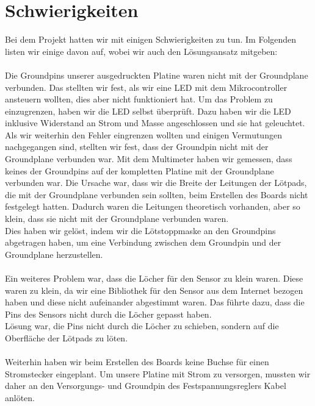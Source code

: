 \documentclass[]{article}
\begin{document}
\section{Schwierigkeiten}
Bei dem Projekt hatten wir mit einigen Schwierigkeiten zu tun. Im Folgenden listen wir einige davon auf, wobei wir auch den Lösungsansatz mitgeben:
\\\\Die Groundpins unserer ausgedruckten Platine waren nicht mit der Groundplane verbunden. Das stellten wir fest, als wir eine LED mit dem Mikrocontroller ansteuern wollten, dies aber nicht funktioniert hat. Um das Problem zu einzugrenzen, haben wir die LED selbst überprüft. Dazu haben wir die LED inklusive Widerstand an Strom und Masse angeschlossen und sie hat geleuchtet. Als wir weiterhin den Fehler eingrenzen wollten und einigen Vermutungen nachgegangen sind, stellten wir fest, dass der Groundpin nicht mit der Groundplane verbunden war. Mit dem Multimeter haben wir gemessen, dass keines der Groundpins auf der kompletten Platine mit der Groundplane verbunden war. Die Ursache war, dass wir die Breite der Leitungen der Lötpads, die mit der Groundplane verbunden sein sollten, beim Erstellen des Boards nicht festgelegt hatten. Dadurch waren die Leitungen theoretisch vorhanden, aber so klein, dass sie nicht mit der Groundplane verbunden waren.
\\Dies haben wir gelöst, indem wir die Lötstoppmaske an den Groundpins abgetragen haben, um eine Verbindung zwischen dem Groundpin und der Groundplane herzustellen.
\\\\Ein weiteres Problem war, dass die Löcher für den Sensor zu klein waren. Diese waren zu klein, da wir eine Bibliothek für den Sensor aus dem Internet bezogen haben und diese nicht aufeinander abgestimmt waren. Das führte dazu, dass die Pins des Sensors nicht durch die Löcher gepasst haben.
\\Lösung war, die Pins nicht durch die Löcher zu schieben, sondern auf die Oberfläche der Lötpads zu löten.
\\\\Weiterhin haben wir beim Erstellen des Boards keine Buchse für einen Stromstecker eingeplant. Um unsere Platine mit Strom zu versorgen, mussten wir daher an den Versorgungs- und Groundpin des Festspannungsreglers Kabel anlöten.
\end{document}
